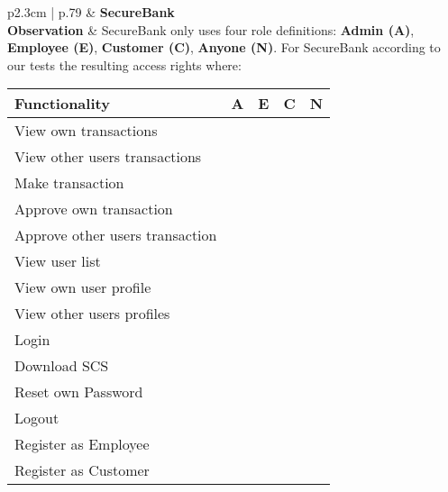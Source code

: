 \begin{longtable}[l]{p{2.3cm} | p{.79\linewidth}}
    \hline
    & \textbf{SecureBank} \\ 
    \hline
    \textbf{Observation} &
        SecureBank only uses four role definitions: \textbf{Admin (A)}, \textbf{Employee (E)}, \textbf{Customer (C)}, \textbf{Anyone (N)}.
        For SecureBank according to our tests the resulting access rights where:
        \begin{center}
            \begin{tabular}{ | l | l | l | l | l |}
            \hline
            \textbf{Functionality}          & \textbf{A} & \textbf{E} & \textbf{C} & \textbf{N} \\ \hline
            View own transactions           & \xmark    & \xmark    & \cmark    & \xmark \\ \hline
            View other users transactions   & \cmark    & \cmark    & \xmark    & \xmark \\ \hline
            Make transaction                & \xmark    & \xmark    & \cmark    & \xmark \\ \hline
            Approve own transaction         & \xmark    & \xmark    & \xmark    & \xmark \\ \hline
            Approve other users transaction & \cmark    & \cmark    & \xmark    & \xmark \\ \hline
            View user list                  & \cmark    & \cmark    & \xmark    & \xmark \\ \hline
            View own user profile           & \cmark    & \cmark    & \cmark    & \xmark \\ \hline
            View other users profiles       & \cmark    & \cmark    & \xmark    & \xmark \\ \hline
            Login                           & \cmark    & \cmark    & \cmark    & \xmark \\ \hline
            Download SCS                    & \cmark    & \cmark    & \cmark    & \xmark \\ \hline
            Reset own Password              & \cmark    & \cmark    & \cmark    & \xmark \\ \hline
            Logout                          & \cmark    & \cmark    & \cmark    & \xmark \\ \hline
            Register as Employee            & \xmark    & \xmark    & \xmark    & \cmark \\ \hline
            Register as Customer            & \xmark    & \xmark    & \xmark    & \cmark \\ \hline

\end{tabular}
\end{center}
\end{longtable}
